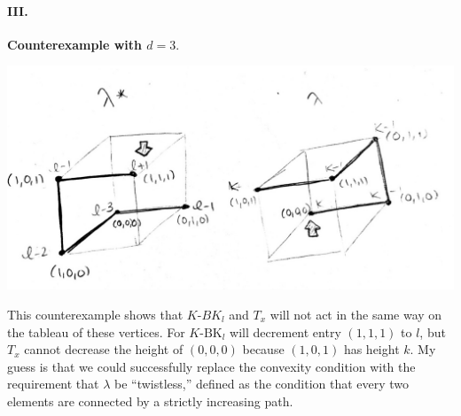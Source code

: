 \documentclass[10pt,letter]{article}
\begin{document}
\paragraph*{III.} \textbf{Counterexample with $d = 3$}.
\begin{center}
\includegraphics[scale=.4]{counterexample_d3.jpg}
\end{center}
This counterexample shows that $K$-$BK_l$ and $T_x$ will not act in the same way on the tableau of these vertices. For $K$-$\text{BK}_l$ will decrement entry $(1,1,1)$ to $l$, but $T_x$ cannot decrease the height of $(0,0,0)$ because $(1,0,1)$ has height $k$. My guess is that we could successfully replace the convexity condition with the requirement that $\lambda$ be ``twistless,'' defined as the condition that every two elements are connected by a strictly increasing path. 
\end{document}
